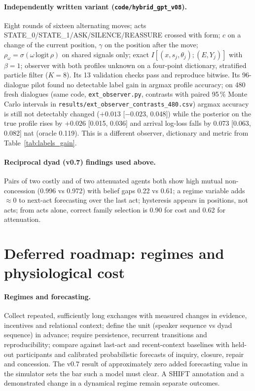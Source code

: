 \documentclass[runningheads]{llncs}
\begin{document}
\paragraph{Independently written variant (\texttt{code/hybrid\_gpt\_v08}).} Eight rounds of sixteen alternating moves; acts STATE\_0/STATE\_1/ASK/SILENCE/REASSURE crossed with form; $c$ on a change of the current position, $\gamma$ on the position after the move; $\rho_\omega=\sigma(\omega\,\mathrm{logit}\,\rho)$ on shared signals only; exact $I[(x,s_j,\theta_j);(E,Y_j)]$ with $\beta=1$; observer with both profiles unknown on a four-point dictionary, stratified particle filter ($K=8$). Its 13 validation checks pass and reproduce bitwise. Its 96-dialogue pilot found no detectable label gain in argmax profile accuracy; on 480 fresh dialogues (same code, \texttt{ext\_observer.py}, contrasts with paired 95\,\% Monte Carlo intervals in \texttt{results/ext\_observer\_contrasts\_480.csv}) argmax accuracy is still not detectably changed ($+0.013$ [$-0.023$, 0.048]) while the posterior on the true profile rises by $+0.026$ [0.015, 0.036] and arrival log-loss falls by 0.073 [0.063, 0.082] nat (oracle 0.119). This is a different observer, dictionary and metric from Table~\ref{tab:labels_gain}. \paragraph{Reciprocal dyad (v0.7) findings used above.} Pairs of two costly and of two attenuated agents both show high mutual non-concession (0.996 vs 0.972) with belief gaps 0.22 vs 0.61; a regime variable adds $\approx0$ to next-act forecasting over the last act; hysteresis appears in positions, not acts; from acts alone, correct family selection is 0.90 for cost and 0.62 for attenuation.

\section{Deferred roadmap: regimes and physiological cost}
\label{app:D}
\paragraph{Regimes and forecasting.} Collect repeated, sufficiently long exchanges with measured changes in evidence, incentives and relational context; define the unit (speaker sequence vs dyad sequence) in advance; require persistence, recurrent transitions and reproducibility; compare against last-act and recent-context baselines with held-out participants and calibrated probabilistic forecasts of inquiry, closure, repair and concession. The v0.7 result of approximately zero added forecasting value in the simulator sets the bar such a model must clear. A SHIFT annotation and a demonstrated change in a dynamical regime remain separate outcomes.
\end{document}
